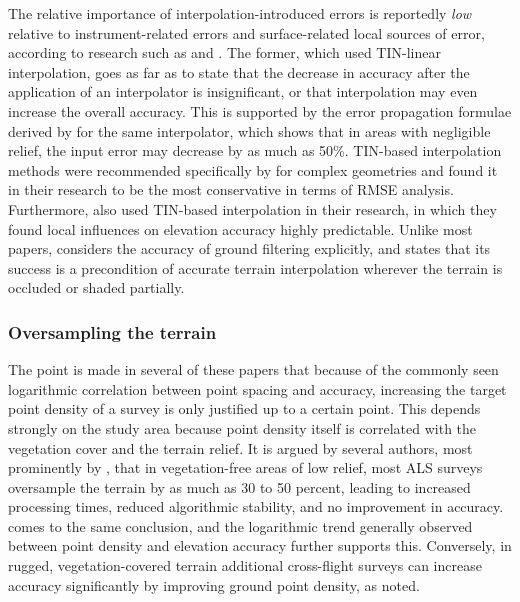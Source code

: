 The relative importance of interpolation-introduced errors is reportedly \textit{low} relative to instrument-related errors and surface-related local sources of error, according to research such as \cite{hodgson_breshanan_2004} and \cite{aguilar_etal_2010}. The former, which used TIN-linear interpolation, goes as far as to state that the decrease in accuracy after the application of an interpolator is insignificant, or that interpolation may even increase the overall accuracy. This is supported by the error propagation formulae derived by \cite{fan_etal_2014} for the same interpolator, which shows that in areas with negligible relief, the input error may decrease by as much as 50\%. TIN-based interpolation methods were recommended specifically by \cite{bater_coops_2009} for complex geometries and found it in their research to be the most conservative in terms of RMSE analysis. Furthermore, \cite{peng_shih_2006} also used TIN-based interpolation in their research, in which they found local influences on elevation accuracy highly predictable. Unlike most papers, \cite{aguilar_etal_2010} considers the accuracy of ground filtering explicitly, and states that its success is a precondition of accurate terrain interpolation wherever the terrain is occluded or shaded partially.

\subsubsection{Oversampling the terrain}

The point is made in several of these papers that because of the commonly seen logarithmic correlation between point spacing and accuracy, increasing the target point density of a survey is only justified up to a certain point. This depends strongly on the study area because point density itself is correlated with the vegetation cover and the terrain relief. It is argued by several authors, most prominently by \cite{guo_etal_2010}, that in vegetation-free areas of low relief, most ALS surveys oversample the terrain by as much as 30 to 50 percent, leading to increased processing times, reduced algorithmic stability, and no improvement in accuracy. \cite{bater_coops_2009} comes to the same conclusion, and the logarithmic trend generally observed between point density and elevation accuracy further supports this. Conversely, in rugged, vegetation-covered terrain additional cross-flight surveys can increase accuracy significantly by improving ground point density, as \cite{peng_shih_2006} noted.

